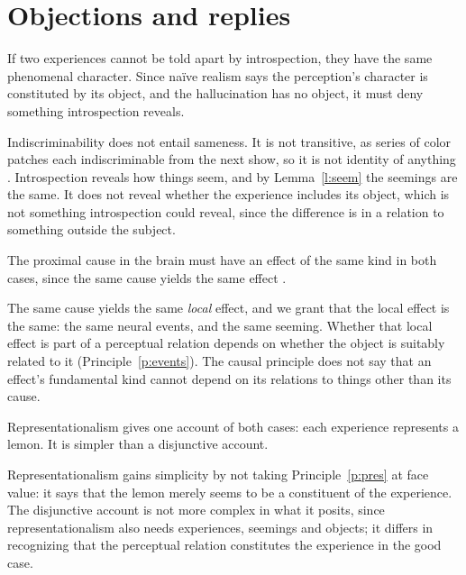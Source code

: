 \documentclass{situationist-preprint}
\begin{document}
\section{Objections and replies}

\begin{objection}\label{o:ident}
If two experiences cannot be told apart by introspection, they have the same phenomenal character. Since naïve realism says the perception's character is constituted by its object, and the hallucination has no object, it must deny something introspection reveals.
\end{objection}

\begin{reply}
Indiscriminability does not entail sameness. It is not transitive, as series of color patches each indiscriminable from the next show, so it is not identity of anything \citep{Williamson1990}. Introspection reveals how things seem, and by Lemma~\ref{l:seem} the seemings are the same. It does not reveal whether the experience includes its object, which is not something introspection could reveal, since the difference is in a relation to something outside the subject.
\end{reply}

\begin{objection}\label{o:causal}
The proximal cause in the brain must have an effect of the same kind in both cases, since the same cause yields the same effect \citep{Robinson1994}.
\end{objection}

\begin{reply}
The same cause yields the same \emph{local} effect, and we grant that the local effect is the same: the same neural events, and the same seeming. Whether that local effect is part of a perceptual relation depends on whether the object is suitably related to it (Principle~\ref{p:events}). The causal principle does not say that an effect's fundamental kind cannot depend on its relations to things other than its cause.
\end{reply}

\begin{objection}\label{o:repr}
Representationalism gives one account of both cases: each experience represents a lemon. It is simpler than a disjunctive account.
\end{objection}

\begin{reply}
Representationalism gains simplicity by not taking Principle~\ref{p:pres} at face value: it says that the lemon merely seems to be a constituent of the experience. The disjunctive account is not more complex in what it posits, since representationalism also needs experiences, seemings and objects; it differs in recognizing that the perceptual relation constitutes the experience in the good case.
\end{reply}
\end{document}

